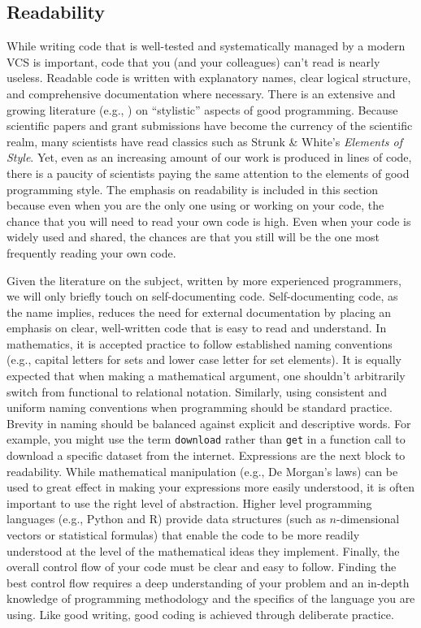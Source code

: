 \documentclass[ChapterTOCs,krantz2]{krantz} %
\begin{document}
\subsection{\label{subsec:readability}Readability}

While writing code that is well-tested and systematically managed by a modern
VCS is important, code that you (and your colleagues) can't read is nearly
useless. Readable code is written with explanatory names, clear logical
structure, and comprehensive documentation where necessary.  There is an
extensive and growing literature (e.g., \cite{boswell2011art, Fow00,
kernighan1999practice, HT00, mcconnell2009code}) on ``stylistic'' aspects of
good programming. Because scientific papers and grant submissions have become
the currency of the scientific realm, many scientists have read classics such
as Strunk \& White's \emph{Elements of Style}. Yet, even as an increasing
amount of our work is produced in lines of code, there is a paucity of
scientists paying the same attention to the elements of good programming style.
The emphasis on readability is included in this section because even when you
are the only one using or working on your code, the chance that you will need
to read your own code is high. Even when your code is widely used and shared,
the chances are that you still will be the one most frequently reading your own
code.

Given the literature on the subject, written by more experienced programmers,
we will only briefly touch on self-documenting code. Self-documenting code, as
the name implies, reduces the need for external documentation by placing an
emphasis on clear, well-written code that is easy to read and understand.  In
mathematics, it is accepted practice to follow established naming conventions
(e.g., capital letters for sets and lower case letter for set elements). It is
equally expected that when making a mathematical argument, one shouldn't
arbitrarily switch from functional to relational notation.  Similarly, using
consistent and uniform naming conventions when programming should be standard
practice. Brevity in naming should be balanced against explicit and descriptive
words. For example, you might use the term \texttt{download} rather than
\texttt{get} in a function call to download a specific dataset from the
internet. Expressions are the next block to readability. While mathematical
manipulation (e.g., De Morgan's laws) can be used to great effect in making
your expressions more easily understood, it is often important to use the right
level of abstraction. Higher level programming languages (e.g., Python and R)
provide data structures (such as $n$-dimensional vectors or statistical
formulas) that enable the code to be more readily understood at the level of
the mathematical ideas they implement. Finally, the overall control flow of
your code must be clear and easy to follow. Finding the best control flow
requires a deep understanding of your problem and an in-depth knowledge of
programming methodology and the specifics of the language you are using.
Like good writing, good coding is achieved through deliberate practice.
\end{document}
